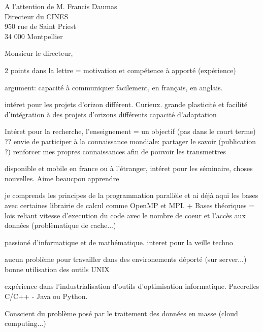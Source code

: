 \documentclass[12pt]{lettre}
\begin{document}
\begin{letter}{A l'attention de M. Francis Daumas\\Directeur du CINES\\950 rue de Saint Priest\\34 000 Montpellier}
\address{Victor Cameo Ponz\\16 rue Peyras\\31000 Toulouse}
\nofax

\conc{}
\opening{Monsieur le directeur,}
2 points dans la lettre = motivation et compétence à apporté (expérience)

argument:
capacité à communiquer facilement, en français, en anglais.

intéret pour les projets d'orizon différent. Curieux.
grande plasticité et facilité d'intégration à des projets d'orizons différents
capacité d'adaptation

Intéret pour la recherche, l'enseignement = un objectif (pas dans le court terme) ?? envie de participer à la connaissance mondiale: partager le savoir (publication ?) renforcer mes propres connaissances afin de pouvoir les transmettres

disponible et mobile en france ou à l'étranger, intéret pour les séminaire, choses nouvelles. Aime beaucpou apprendre

je comprends les principes de la programmation parallèle et ai déjà aqui les bases avec certaines librairie de calcul comme OpenMP et MPI. + Bases théoriques = lois reliant vitesse d'execution du code avec le nombre de coeur et l'accès aux données (problèmatique de cache...)

passioné d'informatique et de mathématique. interet pour la veille techno

aucun problème pour travailler dans des environements déporté (sur server...) bonne utilisation des outils UNIX

expérience dans l'industrialisation d'outils d'optimisation informatique. Pacerelles C/C++ - Java ou Python.

Conscient du problème posé par le traitement des données en masse (cloud computing...)


\end{letter}
\end{document}
